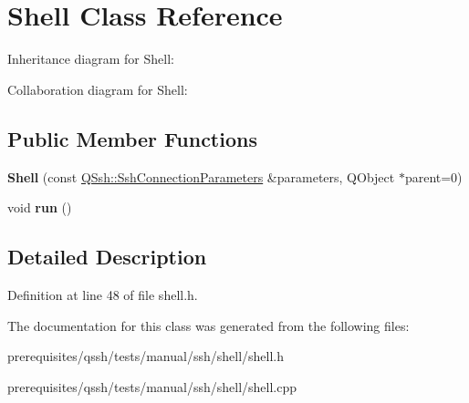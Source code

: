 \hypertarget{class_shell}{}\section{Shell Class Reference}
\label{class_shell}


Inheritance diagram for Shell\+:


Collaboration diagram for Shell\+:
\subsection*{Public Member Functions}
\begin{DoxyCompactItemize}
\item 
\mbox{\label{class_shell_aad523ef48b257a4e4fd97a5bcd0993c4}} 
{\bfseries Shell} (const \mbox{\hyperlink{class_q_ssh_1_1_ssh_connection_parameters}{Q\+Ssh\+::\+Ssh\+Connection\+Parameters}} \&parameters, Q\+Object $\ast$parent=0)
\item 
\mbox{\label{class_shell_a06e62a83dce295a3769013b3bbbe0ed1}} 
void {\bfseries run} ()
\end{DoxyCompactItemize}


\subsection{Detailed Description}


Definition at line 48 of file shell.\+h.



The documentation for this class was generated from the following files\+:\begin{DoxyCompactItemize}
\item 
prerequisites/qssh/tests/manual/ssh/shell/shell.\+h\item 
prerequisites/qssh/tests/manual/ssh/shell/shell.\+cpp\end{DoxyCompactItemize}
